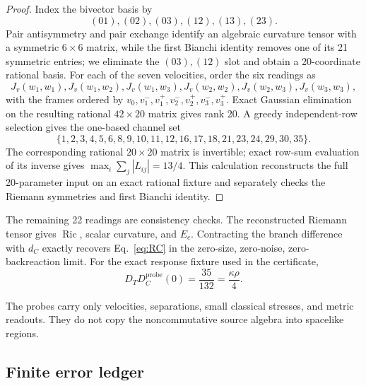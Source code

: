 \documentclass[11pt]{article}
\theoremstyle{definition}
\theoremstyle{remark}
\newcommand{\Ric}{\operatorname{Ric}}
\begin{document}
\begin{proof}
Index the bivector basis by
\begin{equation}
 (01),(02),(03),(12),(13),(23).
\end{equation}
Pair antisymmetry and pair exchange identify an algebraic curvature tensor with a symmetric $6\times6$ matrix, while the first Bianchi identity removes one of its 21 symmetric entries; we eliminate the $(03),(12)$ slot and obtain a 20-coordinate rational basis. For each of the seven velocities, order the six readings as
\begin{equation}
 J_v(w_1,w_1),J_v(w_1,w_2),J_v(w_1,w_3),
 J_v(w_2,w_2),J_v(w_2,w_3),J_v(w_3,w_3),
\end{equation}
with the frames ordered by $v_0,v_1^-,v_1^+,v_2^-,v_2^+,v_3^-,v_3^+$. Exact Gaussian elimination on the resulting rational $42\times20$ matrix gives rank 20. A greedy independent-row selection gives the one-based channel set
\begin{equation}
 \{1,2,3,4,5,6,8,9,10,11,12,16,17,18,21,23,24,29,30,35\}.
\end{equation}
The corresponding rational $20\times20$ matrix is invertible; exact row-sum evaluation of its inverse gives $\max_i\sum_j|L_{ij}|=13/4$. This calculation reconstructs the full 20-parameter input on an exact rational fixture and separately checks the Riemann symmetries and first Bianchi identity.
\end{proof}

The remaining 22 readings are consistency checks. The reconstructed Riemann tensor gives $\Ric$, scalar curvature, and $E_c$. Contracting the branch difference with $d_C$ exactly recovers Eq.~\eqref{eq:RC} in the zero-size, zero-noise, zero-backreaction limit. For the exact response fixture used in the certificate,
\begin{equation}
  D_TD_C^{\mathrm{probe}}(0)=\frac{35}{132}=\frac{\kappa\rho}{4}.
\end{equation}

The probes carry only velocities, separations, small classical stresses, and metric readouts. They do not copy the noncommutative source algebra into spacelike regions.

\subsection{Finite error ledger}
\end{document}

